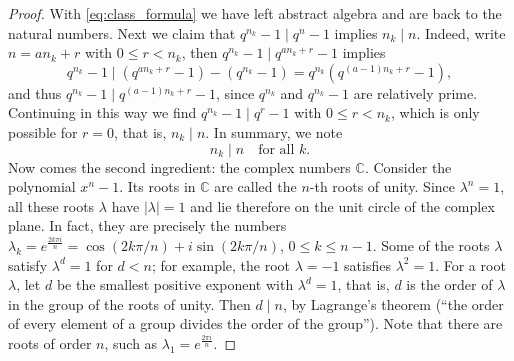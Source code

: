 \begin{proof}
  With \eqref{eq:class_formula} we have left abstract algebra and are back to the natural numbers.
  Next we claim that $q^{n_k} - 1 \mid q^n - 1$ implies $n_k \mid n$.
  Indeed, write $n = a n_k + r$ with $0 \le r < n_k$, then $q^{n_k} - 1 \mid q^{a n_k + r} - 1$ implies
  \[
  q^{n_k} - 1 \mid (q^{a n_k + r} - 1) - (q^{n_k} - 1) = q^{n_k} (q^{(a-1)n_k + r} - 1),
  \]
  and thus $q^{n_k} - 1 \mid q^{(a-1)n_k + r} - 1$, since $q^{n_k}$ and $q^{n_k} - 1$ are relatively prime.
  Continuing in this way we find $q^{n_k} - 1 \mid q^r - 1$ with $0 \le r < n_k$, which is only possible for $r = 0$, that is, $n_k \mid n$.
  In summary, we note
  \begin{equation} \label{eq:nk_divides_n}
  n_k \mid n \quad \text{for all } k.
  \end{equation}
  Now comes the second ingredient: the complex numbers $\mathbb{C}$.
  Consider the polynomial $x^n - 1$.
  Its roots in $\mathbb{C}$ are called the $n$-th roots of unity.
  Since $\lambda^n = 1$, all these roots $\lambda$ have $|\lambda| = 1$ and lie therefore on the unit circle of the complex plane.
  In fact, they are precisely the numbers $\lambda_k = e^{\frac{2k\pi i}{n}} = \cos(2k\pi/n) + i \sin(2k\pi/n)$, $0 \le k \le n - 1$.
  Some of the roots $\lambda$ satisfy $\lambda^d = 1$ for $d < n$;
  for example, the root $\lambda = -1$ satisfies $\lambda^2 = 1$.
  For a root $\lambda$, let $d$ be the smallest positive exponent with $\lambda^d = 1$,
  that is, $d$ is the order of $\lambda$ in the group of the roots of unity.
  Then $d \mid n$, by Lagrange's theorem (``the order of every element of a group divides the order of the group'').
  Note that there are roots of order $n$, such as $\lambda_1 = e^{\frac{2\pi i}{n}}$.
  

\end{proof}

